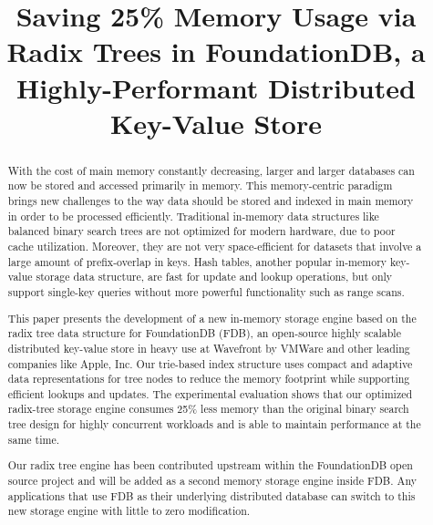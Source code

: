 \documentclass[sigplan,screen,nonacm]{acmart}
\begin{document}
\title{Saving 25\% Memory Usage via Radix Trees in FoundationDB, a Highly-Performant Distributed Key-Value Store}

\begin{abstract}
With the cost of main memory constantly decreasing, larger and larger databases can now be stored and accessed primarily in memory. This memory-centric paradigm brings new challenges to the way data should be stored and indexed in main memory in order to be processed efficiently. Traditional in-memory data structures like balanced binary search trees are not optimized for modern hardware, due to poor cache utilization. Moreover, they are not very space-efficient for datasets that involve a large amount of prefix-overlap in keys. Hash tables, another popular in-memory key-value storage data structure, are fast for update and lookup operations, but only support single-key queries without more powerful functionality such as range scans. 

This paper presents the development of a new in-memory storage engine based on the radix tree data structure for FoundationDB (FDB), an open-source highly scalable distributed key-value store in heavy use at Wavefront by VMWare and other leading companies like Apple, Inc.  Our trie-based index structure uses compact and adaptive data representations for tree nodes to reduce the memory footprint while supporting efficient lookups and updates. The experimental evaluation shows that our optimized radix-tree storage engine consumes 25\% less memory than the original binary search tree design for highly concurrent workloads and is able to maintain performance at the same time. 

Our radix tree engine has been contributed upstream within the FoundationDB open source project and will be added as a second memory storage engine inside FDB. Any applications that use FDB as their underlying distributed database can switch to this new storage engine with little to zero modification.
 
\end{abstract}

\end{document}
